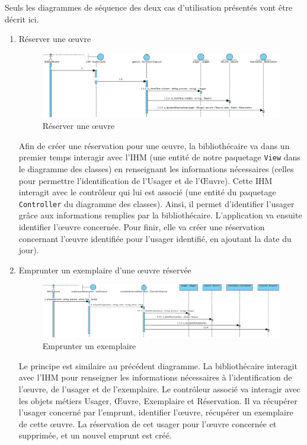 \documentclass[a4paper,12pt]{article}
\begin{document}
Seuls les diagrammes de séquence des deux cas d’utilisation présentés vont être décrit ici.

\begin{enumerate}
\item Réserver une œuvre
\label{sec:orgheadline9}

\begin{figure}[htb]
\centering
\includegraphics[width=.9\linewidth]{./res/img/reserver-oeuvre.png}
\caption{\label{fig:orgparagraph5}
Réserver une œuvre}
\end{figure}


Afin de créer une réservation pour une œuvre, la bibliothécaire va dans un
premier temps interagir avec l’IHM (une entité de notre paquetage \texttt{View} dans le
diagramme des classes) en renseignant les informations nécessaires (celles pour
permettre l’identification de l’Usager et de l’Œuvre). Cette IHM interagit avec
le contrôleur qui lui est associé (une entité du paquetage \texttt{Controller} du
diagramme des classes). Ainsi, il permet d’identifier l’usager grâce aux
informations remplies par la bibliothécaire. L’application va ensuite identifier
l’œuvre concernée. Pour finir, elle va créer une réservation concernant
l’œuvre identifiée pour l’usager identifié, en ajoutant la date du jour).

\item Emprunter un exemplaire d’une œuvre réservée
\label{sec:orgheadline10}

\begin{figure}[htb]
\centering
\includegraphics[width=.9\linewidth]{./res/img/emprunter-exemplaire1.png}
\caption{\label{fig:orgparagraph6}
Emprunter un exemplaire}
\end{figure}

Le principe est similaire au précédent diagramme.
La bibliothécaire interagit avec l’IHM pour renseigner les informations
nécessaires à l’identification de l’œuvre, de l’usager et de l’exemplaire.
Le contrôleur associé va interagir avec les objets métiers Usager, Œuvre,
Exemplaire et Réservation. Il va récupérer l’usager concerné par l’emprunt,
identifier l’œuvre, récupérer un exemplaire de cette œuvre. La réservation
de cet usager pour l’œuvre concernée et supprimée, et un nouvel emprunt est
créé.
\end{enumerate}
\end{document}
